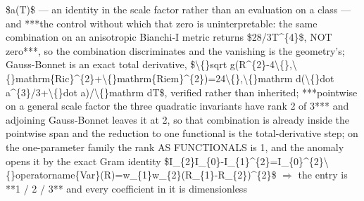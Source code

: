 \begin{description}
\$a(T)\$ --- an identity in the scale factor rather than an evaluation on a class --- and ***the control without which that zero is uninterpretable: the same combination on an anisotropic Bianchi-I metric returns \$28/3T\textasciicircum{}\{4\}\$, NOT zero***, so the combination discriminates and the vanishing is the geometry's; Gauss-Bonnet is an exact total derivative, \$\textbackslash\{\}sqrt g(R\textasciicircum{}\{2\}-4\textbackslash\{\},\textbackslash\{\}mathrm\{Ric\}\textasciicircum{}\{2\}+\textbackslash\{\}mathrm\{Riem\}\textasciicircum{}\{2\})=24\textbackslash\{\},\textbackslash\{\}mathrm d(\textbackslash\{\}dot a\textasciicircum{}\{3\}/3+\textbackslash\{\}dot a)/\textbackslash\{\}mathrm dT\$, verified rather than inherited; ***pointwise on a general scale factor the three quadratic invariants have rank 2 of 3*** and adjoining Gauss-Bonnet leaves it at 2, so that combination is already inside the pointwise span and the reduction to one functional is the total-derivative step; on the one-parameter family the rank AS FUNCTIONALS is 1, and the anomaly opens it by the exact Gram identity \$I\_\{2\}I\_\{0\}-I\_\{1\}\textasciicircum{}\{2\}=I\_\{0\}\textasciicircum{}\{2\}\textbackslash\{\}operatorname\{Var\}(R)=w\_\{1\}w\_\{2\}(R\_\{1\}-R\_\{2\})\textasciicircum{}\{2\}\$ \ensuremath{\Rightarrow} the entry is **1 / 2 / 3** and every coefficient in it is dimensionless

\end{description}
